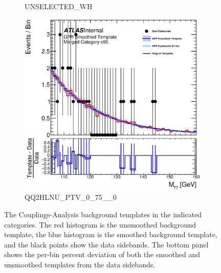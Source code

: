 \begin{figure}
\begin{center}
\begin{subfigure}[T]{0.49\linewidth}
	\caption{UNSELECTED\_WH}
\end{subfigure}
\begin{subfigure}[T]{0.49\linewidth}
	\centering
	\includegraphics[width=\linewidth]{figures/background/gpr/coupCatTemplates/GPR_Smoothed_Plot_hmgg_c65.eps}
	\caption{QQ2HLNU\_PTV\_0\_75\_\_0}
\end{subfigure}
\caption{The Couplings-Analysis background templates in the indicated categories. The red histogram is the unsmoothed background template, the blue histogram is the smoothed background template, and the black points show the data sidebands. The bottom panel shows the per-bin percent deviation of both the smoothed and unsmoothed templates from the data sidebands. }
\label{fig:gpr_coupcat_16}
\end{center}
\end{figure}


